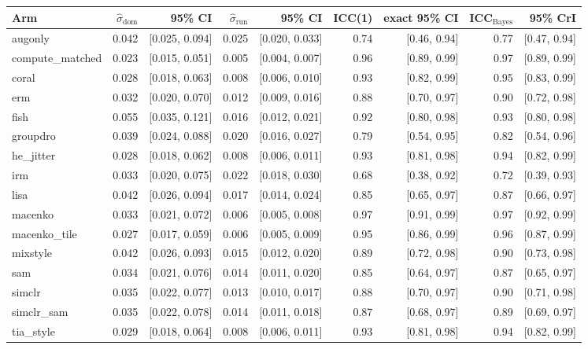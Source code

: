 \begin{tabular}{lrrrrrrrr}
\toprule
Arm & $\hat\sigma_\text{dom}$ & 95\% CI & $\hat\sigma_\text{run}$ & 95\% CI & ICC(1) & exact 95\% CI & ICC$_\text{Bayes}$ & 95\% CrI \\
\midrule
augonly & 0.042 & [0.025, 0.094] & 0.025 & [0.020, 0.033] & 0.74 & [0.46, 0.94] & 0.77 & [0.47, 0.94] \\
compute\_matched & 0.023 & [0.015, 0.051] & 0.005 & [0.004, 0.007] & 0.96 & [0.89, 0.99] & 0.97 & [0.89, 0.99] \\
coral & 0.028 & [0.018, 0.063] & 0.008 & [0.006, 0.010] & 0.93 & [0.82, 0.99] & 0.95 & [0.83, 0.99] \\
erm & 0.032 & [0.020, 0.070] & 0.012 & [0.009, 0.016] & 0.88 & [0.70, 0.97] & 0.90 & [0.72, 0.98] \\
fish & 0.055 & [0.035, 0.121] & 0.016 & [0.012, 0.021] & 0.92 & [0.80, 0.98] & 0.93 & [0.80, 0.98] \\
groupdro & 0.039 & [0.024, 0.088] & 0.020 & [0.016, 0.027] & 0.79 & [0.54, 0.95] & 0.82 & [0.54, 0.96] \\
he\_jitter & 0.028 & [0.018, 0.062] & 0.008 & [0.006, 0.011] & 0.93 & [0.81, 0.98] & 0.94 & [0.82, 0.99] \\
irm & 0.033 & [0.020, 0.075] & 0.022 & [0.018, 0.030] & 0.68 & [0.38, 0.92] & 0.72 & [0.39, 0.93] \\
lisa & 0.042 & [0.026, 0.094] & 0.017 & [0.014, 0.024] & 0.85 & [0.65, 0.97] & 0.87 & [0.66, 0.97] \\
macenko & 0.033 & [0.021, 0.072] & 0.006 & [0.005, 0.008] & 0.97 & [0.91, 0.99] & 0.97 & [0.92, 0.99] \\
macenko\_tile & 0.027 & [0.017, 0.059] & 0.006 & [0.005, 0.009] & 0.95 & [0.86, 0.99] & 0.96 & [0.87, 0.99] \\
mixstyle & 0.042 & [0.026, 0.093] & 0.015 & [0.012, 0.020] & 0.89 & [0.72, 0.98] & 0.90 & [0.73, 0.98] \\
sam & 0.034 & [0.021, 0.076] & 0.014 & [0.011, 0.020] & 0.85 & [0.64, 0.97] & 0.87 & [0.65, 0.97] \\
simclr & 0.035 & [0.022, 0.077] & 0.013 & [0.010, 0.017] & 0.88 & [0.70, 0.97] & 0.90 & [0.71, 0.98] \\
simclr\_sam & 0.035 & [0.022, 0.078] & 0.014 & [0.011, 0.018] & 0.87 & [0.68, 0.97] & 0.89 & [0.69, 0.97] \\
tia\_style & 0.029 & [0.018, 0.064] & 0.008 & [0.006, 0.011] & 0.93 & [0.81, 0.98] & 0.94 & [0.82, 0.99] \\
\bottomrule
\end{tabular}
